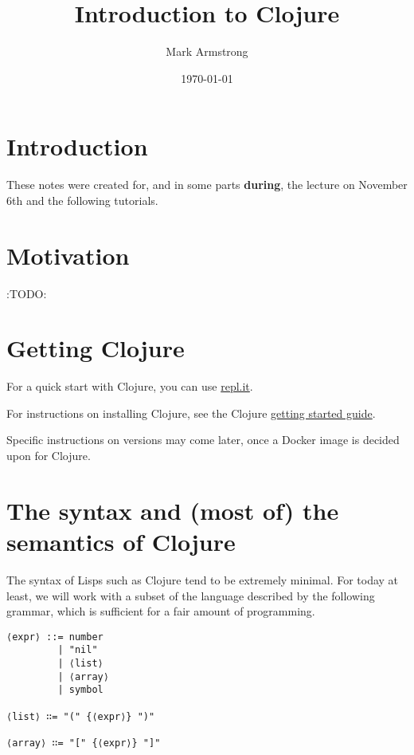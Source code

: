 \documentclass[11pt]{article}
\author{Mark Armstrong}
\date{\today}
\title{Introduction to Clojure}
\begin{document}
\maketitle
\tableofcontents


\section{Introduction}
\label{sec:org4f84151}
These notes were created for, and in some parts \textbf{during},
the lecture on November 6th and the following tutorials.

\section{Motivation}
\label{sec:orgfb8e3f0}
:TODO:

\section{Getting Clojure}
\label{sec:org967b255}
For a quick start with Clojure, you can use
\href{https://repl.it/languages/clojure}{repl.it}.

For instructions on installing Clojure,
see the Clojure \href{https://clojure.org/guides/getting\_started}{getting started guide}.

Specific instructions on versions may come later,
once a Docker image is decided upon for Clojure.

\section{The syntax and (most of) the semantics of Clojure}
\label{sec:org7b456e6}
The syntax of Lisps such as Clojure tend to be extremely minimal.
For today at least, we will work with a subset of the language
described by the following grammar, which is sufficient
for a fair amount of programming.
\begin{verbatim}
⟨expr⟩ ::= number
         | "nil"
         | ⟨list⟩
         | ⟨array⟩
         | symbol

⟨list⟩ ∷= "(" {⟨expr⟩} ")"

⟨array⟩ ∷= "[" {⟨expr⟩} "]"
\end{verbatim}
\end{document}
